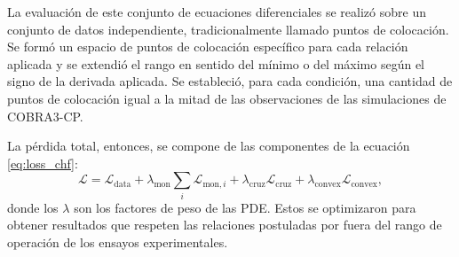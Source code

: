 
La evaluación de este conjunto de ecuaciones diferenciales se realizó sobre un conjunto de datos independiente, tradicionalmente llamado puntos de colocación. Se formó un espacio de puntos de colocación específico para cada relación aplicada y se extendió el rango en sentido del mínimo o del máximo según el signo de la derivada aplicada. Se estableció, para cada condición, una cantidad de puntos de colocación igual a la mitad de las observaciones de las simulaciones de COBRA3-CP.

La pérdida total, entonces, se compone de las componentes de la ecuación \ref{eq:loss_chf}:
\begin{equation}
    \label{eq:loss_chf}
    \mathcal{L} = \mathcal{L}_\mathrm{data} + \lambda_\mathrm{mon} \sum_i \mathcal{L}_{\mathrm{mon},i} + \lambda_\mathrm{cruz} \mathcal{L}_\mathrm{cruz} + \lambda_\mathrm{convex} \mathcal{L}_\mathrm{convex}
    ,
\end{equation}
donde los $\lambda$ son los factores de peso de las PDE. Estos se optimizaron para obtener resultados que respeten las relaciones postuladas por fuera del rango de operación de los ensayos experimentales.

